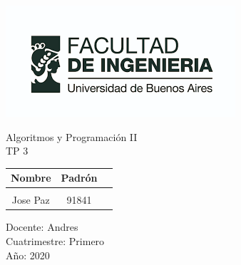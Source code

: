 \documentclass[a4paper,11pt]{article}
\begin{document}
\marginsize{2cm}{2cm}{2cm}{2cm}
\renewcommand\contentsname{Indice}
\renewcommand{\footrulewidth}{0.4pt}
\renewcommand{\headrulewidth}{0.4pt}

\pagestyle{empty}
\includegraphics[scale=0.3]{logo.png}

\begin{center}
	\Huge{Algoritmos y Programación II}\\
	\Huge{TP 3}\\
\end{center}
\vspace{4cm}

\begin{center}
	\begin{tabular}{|c|c|c|}
		\hline
		\textbf{Nombre}  & \textbf{Padrón}\\
		\hline
		 \hspace{6cm}  & \hspace{3cm}\\
		 \hline
		 Jose Paz & 91841   \\
		 \hline		 
	\end{tabular}
\end{center}

\vfill 

\begin{flushleft}
	\Large{Docente: Andres }\\
	\Large{Cuatrimestre: Primero}\\
	\Large{Año: 2020}\\
\end{flushleft}


\newpage
\setcounter{page}{1}
\end{document}
